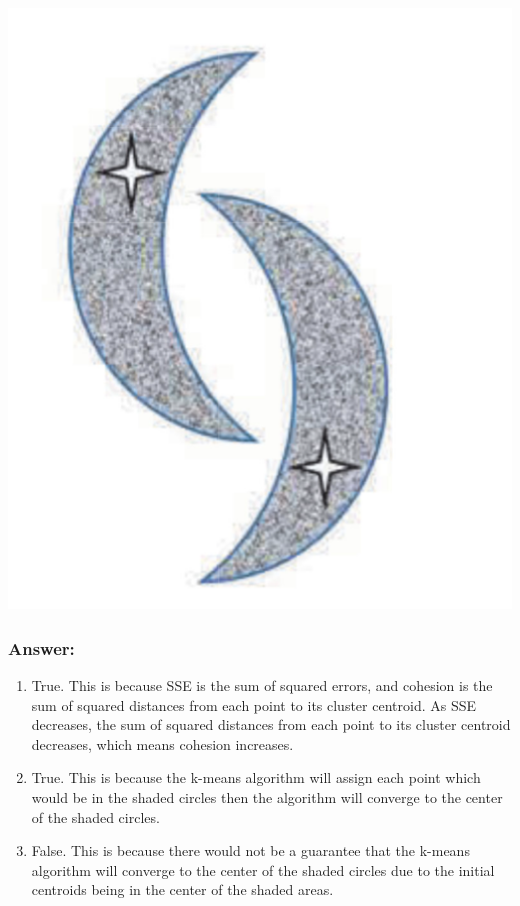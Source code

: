 \documentclass{article}
\begin{document}
\begin{enumerate}[label= (\alph*)]
\begin{center}
        \includegraphics[scale=0.5]{images/Q2P3B.png}
    \end{center}
\end{enumerate}

\subsubsection*{Answer:}

\begin{enumerate}[label= (\alph*)]
    \item True. This is because SSE is the sum of squared errors, and cohesion is the sum of squared distances from each point to its cluster centroid. As SSE decreases, the sum of squared distances from each point to its cluster centroid decreases, which means cohesion increases.
    \item True. This is because the k-means algorithm will assign each point which would be in the shaded circles then the algorithm will converge to the center of the shaded circles.
    \item False. This is because there would not be a guarantee that the k-means algorithm will converge to the center of the shaded circles due to the initial centroids being in the center of the shaded areas.
\end{enumerate}
\end{document}
